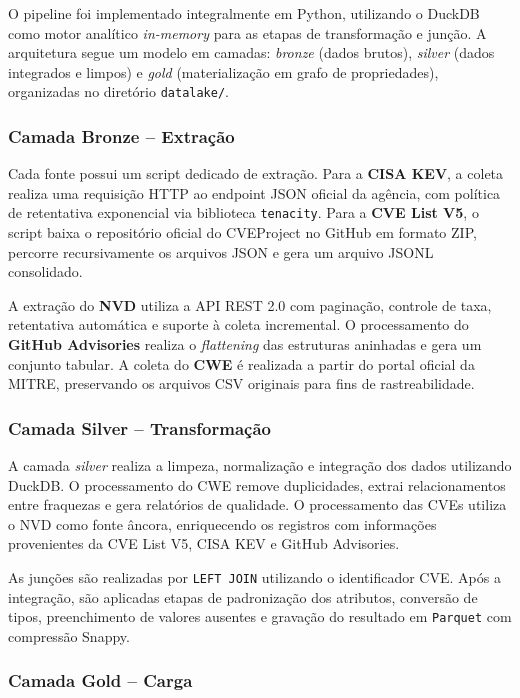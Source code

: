 O pipeline foi implementado integralmente em Python, utilizando o DuckDB como motor analítico \textit{in-memory} para as etapas de transformação e junção. A arquitetura segue um modelo em camadas: \textit{bronze} (dados brutos), \textit{silver} (dados integrados e limpos) e \textit{gold} (materialização em grafo de propriedades), organizadas no diretório \texttt{datalake/}.


\subsubsection{Camada Bronze -- Extração}

Cada fonte possui um script dedicado de extração. Para a \textbf{CISA KEV}, a coleta realiza uma requisição HTTP ao endpoint JSON oficial da agência, com política de retentativa exponencial via biblioteca \texttt{tenacity}. Para a \textbf{CVE List V5}, o script baixa o repositório oficial do CVEProject no GitHub em formato ZIP, percorre recursivamente os arquivos JSON e gera um arquivo JSONL consolidado.

A extração do \textbf{NVD} utiliza a API REST 2.0 com paginação, controle de taxa, retentativa automática e suporte à coleta incremental. O processamento do \textbf{GitHub Advisories} realiza o \textit{flattening} das estruturas aninhadas e gera um conjunto tabular. A coleta do \textbf{CWE} é realizada a partir do portal oficial da MITRE, preservando os arquivos CSV originais para fins de rastreabilidade.

\subsubsection{Camada Silver -- Transformação}

A camada \textit{silver} realiza a limpeza, normalização e integração dos dados utilizando DuckDB. O processamento do CWE remove duplicidades, extrai relacionamentos entre fraquezas e gera relatórios de qualidade. O processamento das CVEs utiliza o NVD como fonte âncora, enriquecendo os registros com informações provenientes da CVE List V5, CISA KEV e GitHub Advisories.

As junções são realizadas por \texttt{LEFT JOIN} utilizando o identificador CVE. Após a integração, são aplicadas etapas de padronização dos atributos, conversão de tipos, preenchimento de valores ausentes e gravação do resultado em \texttt{Parquet} com compressão Snappy.

\subsubsection{Camada Gold -- Carga}

